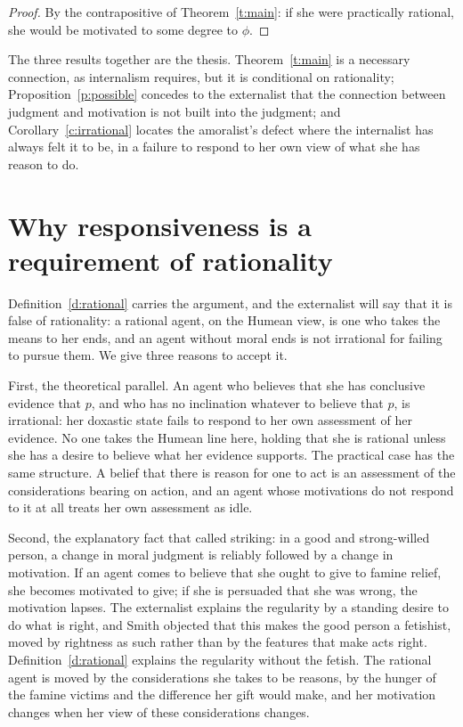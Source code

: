 \documentclass{situationist-preprint}
\begin{document}
\begin{proof}
By the contrapositive of Theorem~\ref{t:main}: if she were practically rational, she would be motivated to some degree to $\phi$.
\end{proof}

The three results together are the thesis. Theorem~\ref{t:main} is a necessary connection, as internalism requires, but it is conditional on rationality; Proposition~\ref{p:possible} concedes to the externalist that the connection between judgment and motivation is not built into the judgment; and Corollary~\ref{c:irrational} locates the amoralist's defect where the internalist has always felt it to be, in a failure to respond to her own view of what she has reason to do.

\section{Why responsiveness is a requirement of rationality}\label{s:resp}

Definition~\ref{d:rational} carries the argument, and the externalist will say that it is false of rationality: a rational agent, on the Humean view, is one who takes the means to her ends, and an agent without moral ends is not irrational for failing to pursue them. We give three reasons to accept it.

First, the theoretical parallel. An agent who believes that she has conclusive evidence that $p$, and who has no inclination whatever to believe that $p$, is irrational: her doxastic state fails to respond to her own assessment of her evidence. No one takes the Humean line here, holding that she is rational unless she has a desire to believe what her evidence supports. The practical case has the same structure. A belief that there is reason for one to act is an assessment of the considerations bearing on action, and an agent whose motivations do not respond to it at all treats her own assessment as idle.

Second, the explanatory fact that \citet{Smith1994} called striking: in a good and strong-willed person, a change in moral judgment is reliably followed by a change in motivation. If an agent comes to believe that she ought to give to famine relief, she becomes motivated to give; if she is persuaded that she was wrong, the motivation lapses. The externalist explains the regularity by a standing desire to do what is right, and Smith objected that this makes the good person a fetishist, moved by rightness as such rather than by the features that make acts right. Definition~\ref{d:rational} explains the regularity without the fetish. The rational agent is moved by the considerations she takes to be reasons, by the hunger of the famine victims and the difference her gift would make, and her motivation changes when her view of these considerations changes.
\end{document}
